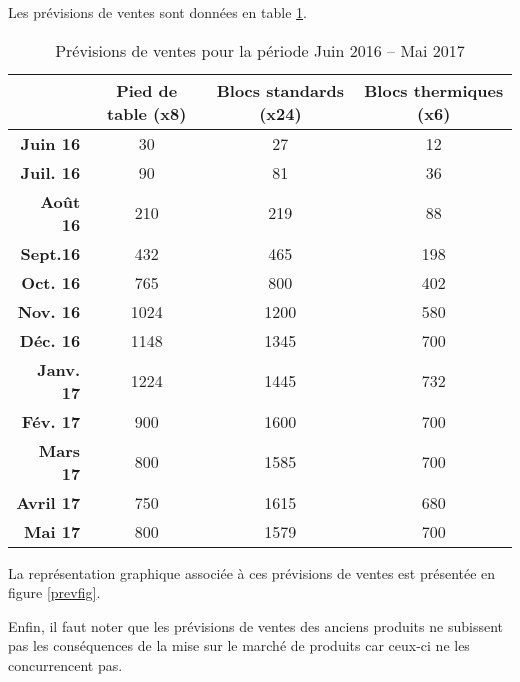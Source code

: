 Les prévisions de ventes sont données en table \ref{prevVente}.
\begin{table}[!ht]
	\centering
	\begin{tabular}{>{\bfseries}rccc}
		\toprule
		& \textbf{Pied de table (x8)} & \textbf{Blocs standards (x24)} &
		\textbf{Blocs
		thermiques (x6)} \\
		\midrule
		Juin 16 & 30 & 27 & 12\\
		Juil. 16 & 90 & 81 & 36\\
		Août 16 & 210 & 219 & 88\\
		Sept.16 & 432 & 465 & 198 \\
		Oct. 16 & 765 & 800 & 402\\
		Nov. 16 & 1024 & 1200 & 580 \\
		Déc. 16 & 1148 & 1345 & 700 \\
		Janv. 17 & 1224 & 1445 & 732\\
		Fév. 17 & 900 & 1600 & 700\\
		Mars 17 & 800 & 1585 & 700\\
		Avril 17 & 750 & 1615 & 680\\
		Mai 17 & 800 & 1579 & 700\\
		\bottomrule
	\end{tabular}
	\caption{Prévisions de ventes pour la période Juin 2016 -- Mai
	2017\label{prevVente}}
\end{table}

La représentation graphique associée à ces prévisions de ventes est
présentée en figure \ref{prevfig}.


Enfin, il faut noter que les prévisions de ventes des anciens produits
ne subissent pas les conséquences de la mise sur le marché de produits car ceux-ci 
ne les concurrencent pas.
